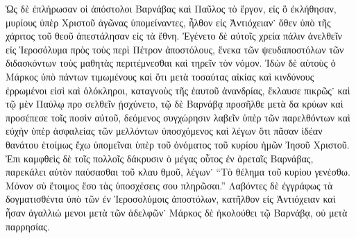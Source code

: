 Ὡς δὲ ἐπλήρωσαν οἱ ἀπόστολοι Βαρνάβας καὶ Παῦλος
τὸ ἔργον, εἰς ὃ ἐκλήθησαν, μυρίους ὑπὲρ Χριστοῦ
ἀγῶνας ὑπομείναντες, ἦλθον εἰς Ἀντιόχειαν˙ ὅθεν ὑπὸ
τῆς χάριτος τοῦ θεοῦ ἀπεστάλησαν εἰς τὰ ἔθνη. Ἐγένετο
δὲ αὐτοῖς χρεία πάλιν ἀνελθεῖν εἰς Ἱεροσόλυμα πρὸς
τοὺς περὶ Πέτρον ἀποστόλους, ἕνεκα τῶν ψευδαποστόλων
τῶν διδασκόντων τοὺς μαθητὰς περιτέμνεσθαι καὶ τηρεῖν
τὸν νόμον. Ἰδὼν δὲ αὐτοὺς ὁ Μάρκος ὑπὸ πάντων
τιμωμένους καὶ ὅτι μετὰ τοσαύτας αἰκίας καὶ κινδύνους
ἐρρωμένοι εἰσὶ καὶ ὁλόκληροι, καταγνοὺς τῆς ἑαυτοῦ
ἀνανδρίας, ἔκλαυσε πικρῶς˙ καὶ τῷ μὲν Παύλῳ προ%
σελθεῖν ᾐσχύνετο, τῷ δὲ Βαρνάβᾳ προσῆλθε μετὰ δα%
κρύων καὶ προσέπεσε τοῖς ποσὶν αὐτοῦ, δεόμενος
συγχώρησιν λαβεῖν ὑπὲρ τῶν παρελθόντων καὶ εὐχὴν
ὑπὲρ ἀσφαλείας τῶν μελλόντων ὑποσχόμενος καὶ λέγων
ὅτι πᾶσαν ἰδέαν θανάτου ἑτοίμως ἔχω ὑπομεῖναι ὑπὲρ
τοῦ ὀνόματος τοῦ κυρίου ἡμῶν Ἰησοῦ Χριστοῦ. Ἐπι%
καμφθεὶς δὲ τοῖς πολλοῖς δάκρυσιν ὁ μέγας οὗτος ἐν
ἀρεταῖς Βαρνάβας, παρεκάλει αὐτὸν παύσασθαι τοῦ κλαυ%
θμοῦ, λέγων˙ \enquote{Τὸ θέλημα τοῦ κυρίου γενέσθω. Μόνον
σὺ ἕτοιμος ἔσο τὰς ὑποσχέσεις σου πληρῶσαι.} Λαβόντες
δὲ ἐγγράφως τὰ δογματισθέντα ὑπὸ τῶν ἐν Ἱεροσολύμοις
ἀποστόλων, κατῆλθον εἰς Ἀντιόχειαν καὶ ἦσαν ἀγαλλιώ%
μενοι μετὰ τῶν ἀδελφῶν˙ Μάρκος δὲ ἠκολούθει τῷ
Βαρνάβᾳ, οὐ μετὰ παρρησίας.

